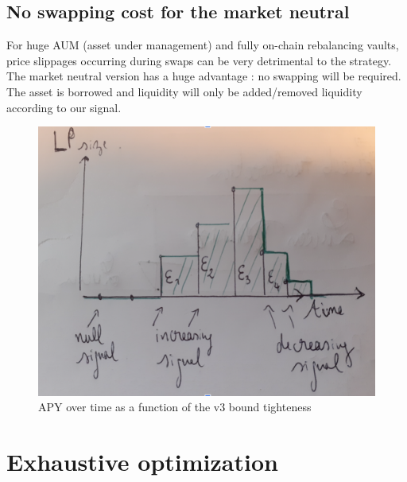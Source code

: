 \documentclass[conference]{IEEEtran}
\begin{document}
\subsection{No swapping cost for the market neutral}
For huge AUM (asset under management) and fully on-chain rebalancing vaults, price slippages occurring during swaps can be very detrimental to the strategy.\\
The market neutral version has a huge advantage : no swapping will be required.\\
The asset is borrowed and liquidity will only be added/removed liquidity according to our signal.\\
\begin{figure}[h!]
    \centering
    \includegraphics[scale=0.25]{Plots/lp_over_time.png}
    \caption{APY over time as a function of the v3 bound tighteness}
    \label{fig:apy_over_time}
\end{figure}

\section{Exhaustive optimization}
\end{document}
